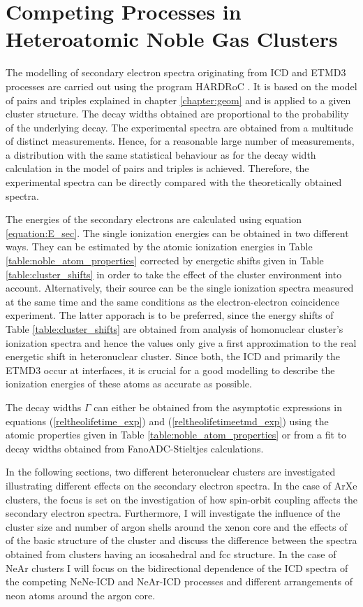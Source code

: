 \chapter[Heteroatomic Noble Gas Clusters]{Competing Processes in Heteroatomic Noble Gas Clusters}
\label{chapter_clusters}

The modelling of secondary electron spectra originating from \ac{ICD}
and \ac{ETMD}3 processes are carried out using the program
HARDRoC \cite{HARDRoC}. It is based on the model of pairs and
triples explained in chapter \ref{chapter:geom} and is applied
to a given cluster structure. The 
decay widths obtained are proportional to the probability of the underlying decay.
The experimental spectra are obtained from a multitude of distinct measurements.
Hence, for a reasonable large number of measurements, a distribution with the
same statistical behaviour as for the decay width calculation in the
model of pairs and triples is achieved. Therefore, the experimental spectra
can be directly compared with the theoretically obtained spectra.

The energies of the secondary electrons are calculated using
equation \ref{equation:E_sec}. The single ionization energies
can be obtained in two different ways. They can be
estimated by the atomic ionization energies in Table
\ref{table:noble_atom_properties} corrected by energetic shifts
given in Table \ref{table:cluster_shifts} in order to take
the effect of the cluster environment into account. 
Alternatively, their source can be the single ionization spectra measured
at the same time and the
same conditions as the electron-electron
coincidence experiment. The latter apporach is to be preferred,
since the energy shifts
of Table \ref{table:cluster_shifts} are obtained from analysis of
homonuclear cluster's ionization spectra and
hence the values only give a first approximation to the real energetic shift in
heteronuclear cluster. Since both, the \ac{ICD} and primarily the
\ac{ETMD}3 occur at interfaces, it is crucial for a good modelling to
describe the ionization energies of these atoms as accurate as possible.

The decay widths $\Gamma$ can either be obtained from the asymptotic expressions
in equations (\ref{reltheolifetime_exp}) and (\ref{reltheolifetimeetmd_exp})
using the atomic properties given in Table \ref{table:noble_atom_properties}
or from a fit to decay widths obtained from FanoADC-Stieltjes calculations.

In the following sections, two different heteronuclear clusters are investigated
illustrating different effects on the secondary electron spectra.
In the case of ArXe clusters, the focus is set on the investigation of how
spin-orbit coupling affects
the secondary electron spectra. Furthermore, I will investigate the influence
of the cluster size and number of argon shells around the xenon core and
the effects of of the basic structure of the cluster and discuss the
difference between the spectra
obtained from clusters having an icosahedral
and \ac{fcc} structure.
In the case of NeAr clusters I will focus on the bidirectional dependence of
the ICD spectra of the competing NeNe-ICD and NeAr-ICD processes and
different arrangements of neon atoms around the argon core.

\newpage

\newpage


